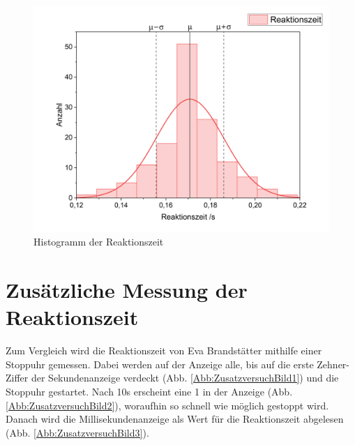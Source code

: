 \documentclass[a4paper,12pt]{article}
\begin{document}
\begin{figure}[H]
    \label{Abb:HistogrammReaktionszeit}
    \centering
    \includegraphics[width=15cm]{bilder/HistogrammReaktionszeit.png}    %
    \caption{Histogramm der Reaktionszeit}                              %
\end{figure}


\section{Zusätzliche Messung der Reaktionszeit}

Zum Vergleich wird die Reaktionszeit von Eva Brandstätter mithilfe einer Stoppuhr gemessen.
Dabei werden auf der Anzeige alle, bis auf die erste Zehner-Ziffer der Sekundenanzeige verdeckt (Abb.
\ref{Abb:ZusatzversuchBild1}) und die Stoppuhr gestartet. Nach 10s erscheint eine 1 in der Anzeige
(Abb. \ref{Abb:ZusatzversuchBild2}), woraufhin so schnell wie möglich gestoppt wird. Danach wird
die Millisekundenanzeige als Wert für die Reaktionszeit abgelesen (Abb. \ref{Abb:ZusatzversuchBild3}).
\end{document}
